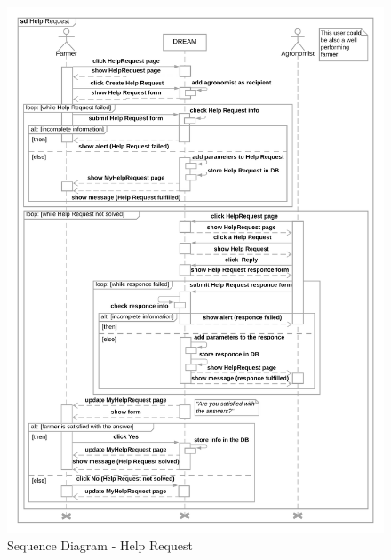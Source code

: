 \begin{center}
    \begin{figure}[H]
  \includegraphics[width=\textwidth,height=\textheight,keepaspectratio]{./Images/Sequence Diagram Help Request.png}
  \caption{Sequence Diagram - Help Request}
\end{figure}
\end{center}



